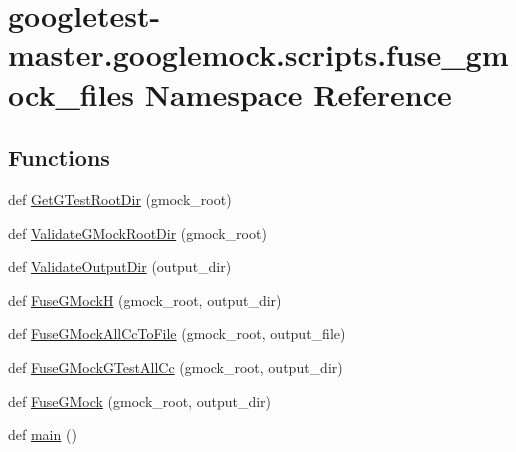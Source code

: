\hypertarget{namespacegoogletest-master_1_1googlemock_1_1scripts_1_1fuse__gmock__files}{}\section{googletest-\/master.googlemock.\+scripts.\+fuse\+\_\+gmock\+\_\+files Namespace Reference}
\label{namespacegoogletest-master_1_1googlemock_1_1scripts_1_1fuse__gmock__files}
\subsection*{Functions}
\begin{DoxyCompactItemize}
\item 
def \mbox{\hyperlink{namespacegoogletest-master_1_1googlemock_1_1scripts_1_1fuse__gmock__files_a6196633d1a12e459d39b773e94e8a3c3}{Get\+G\+Test\+Root\+Dir}} (gmock\+\_\+root)
\item 
def \mbox{\hyperlink{namespacegoogletest-master_1_1googlemock_1_1scripts_1_1fuse__gmock__files_afb4cef28b860d8d84bbe885e454e25bb}{Validate\+G\+Mock\+Root\+Dir}} (gmock\+\_\+root)
\item 
def \mbox{\hyperlink{namespacegoogletest-master_1_1googlemock_1_1scripts_1_1fuse__gmock__files_ac2ebd07cae9a27b8ad5f8bb42d390b4f}{Validate\+Output\+Dir}} (output\+\_\+dir)
\item 
def \mbox{\hyperlink{namespacegoogletest-master_1_1googlemock_1_1scripts_1_1fuse__gmock__files_ab2fdeb0ebbbecafc12b2cbf5f7bab76b}{Fuse\+G\+MockH}} (gmock\+\_\+root, output\+\_\+dir)
\item 
def \mbox{\hyperlink{namespacegoogletest-master_1_1googlemock_1_1scripts_1_1fuse__gmock__files_a91b76eda527214fd34d3460928f84f25}{Fuse\+G\+Mock\+All\+Cc\+To\+File}} (gmock\+\_\+root, output\+\_\+file)
\item 
def \mbox{\hyperlink{namespacegoogletest-master_1_1googlemock_1_1scripts_1_1fuse__gmock__files_a2d81929d6195aba60e5eb5ce6096aad8}{Fuse\+G\+Mock\+G\+Test\+All\+Cc}} (gmock\+\_\+root, output\+\_\+dir)
\item 
def \mbox{\hyperlink{namespacegoogletest-master_1_1googlemock_1_1scripts_1_1fuse__gmock__files_ae972465859b9db472bea086d82d870b8}{Fuse\+G\+Mock}} (gmock\+\_\+root, output\+\_\+dir)
\item 
def \mbox{\hyperlink{namespacegoogletest-master_1_1googlemock_1_1scripts_1_1fuse__gmock__files_ab9913ac0cac64764121d9372344769c9}{main}} ()
\end{DoxyCompactItemize}
